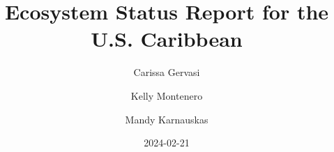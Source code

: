 \documentclass[
  letterpaper,
  oneside,
  open=any]{scrbook}
\title{Ecosystem Status Report for the U.S. Caribbean}
\author{Carissa Gervasi \and Kelly Montenero \and Mandy Karnauskas}
\date{2024-02-21}
\begin{document}

  \begin{frontmatter}

\begin{titlepage}


\newcommand{\titlepagepagealign}{
\ifthenelse{\equal{left}{right}}{\raggedleft}{}
\ifthenelse{\equal{left}{center}}{\centering}{}
\ifthenelse{\equal{left}{left}}{\raggedright}{}
}


\newcommand{\titleandsubtitle}{
{{\large{\bfseries{\nohyphens{Ecosystem Status Report for the U.S.
Caribbean}}}}\par
}%
}
\newcommand{\titlepagetitleblock}{
\titleandsubtitle
}

\newcommand{\authorstyle}[1]{{\large{#1}}}

\newcommand{\affiliationstyle}[1]{{\large{#1}}}

\newcommand{\titlepageauthorblock}{
{\authorstyle{\nohyphens{Carissa
Gervasi}{\textsuperscript{1}},  \nohyphens{Kelly
Montenero}{\textsuperscript{1}} and \nohyphens{Mandy
Karnauskas}{\textsuperscript{2}}}}}

\newcommand{\titlepageaffiliationblock}{
\hangindent=1em
\hangafter=1
{\affiliationstyle{
{1}.~University of Miami,~Cooperative Institute for Marine and
Atmospheric Studies,~4600 Rickenbacker Cswy, Miami, FL 33149
\par\hangindent=1em\hangafter=1{2}.~NOAA Fisheries,~Southeast Fisheries
Science Center,~75 Virginia Beach Drive, Key Biscayne, FL 33149


\vspace{1\baselineskip} 
}}
}
\newcommand{\headerstyled}{%
{The Publisher}
}
\newcommand{\footerstyled}{%
{\large{U.S. DEPARTMENT OF COMMERCE\\
National Oceanic and Atmospheric Administration\\
National Marine Fisheries Service\\
Southeast Fisheries Science Center\\
75 Virginia Beach Drive\\
Miami, Florida 33149\\
February 2024}}
}
\newcommand{\datestyled}{%
{2024-02-21}
}


\newcommand{\titlepageheaderblock}{\headerstyled}

\newcommand{\titlepagefooterblock}{
\footerstyled
}


\end{titlepage}
\end{frontmatter}
\end{document}
